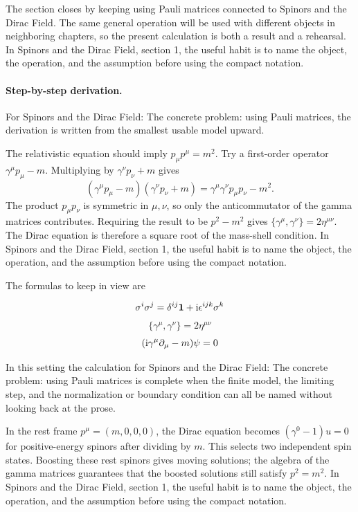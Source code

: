 The section closes by keeping using Pauli matrices connected to Spinors and the Dirac Field.  The same general operation will be used with different objects in neighboring chapters, so the present calculation is both a result and a rehearsal.  In Spinors and the Dirac Field, section 1, the useful habit is to name the object, the operation, and the assumption before using the compact notation.



\paragraph{Step-by-step derivation.}

For Spinors and the Dirac Field: The concrete problem: using Pauli matrices, the derivation is written from the smallest usable model upward.

The relativistic equation should imply \(p_\mu p^\mu=m^2\).  Try a first-order operator \(\gamma^\mu p_\mu-m\).  Multiplying by \(\gamma^\nu p_\nu+m\) gives
\[
  (\gamma^\mu p_\mu-m)(\gamma^\nu p_\nu+m)
  =
  \gamma^\mu\gamma^\nu p_\mu p_\nu-m^2.
\]
The product \(p_\mu p_\nu\) is symmetric in \(\mu,\nu\), so only the anticommutator of the gamma matrices contributes.  Requiring the result to be \(p^2-m^2\) gives \(\{\gamma^\mu,\gamma^\nu\}=2\eta^{\mu\nu}\).  The Dirac equation is therefore a square root of the mass-shell condition.  In Spinors and the Dirac Field, section 1, the useful habit is to name the object, the operation, and the assumption before using the compact notation.

The formulas to keep in view are

\[
  \sigma^i\sigma^j=\delta^{ij}\mathbf 1+\mathrm i\epsilon^{ijk}\sigma^k
\]
\[
  \{\gamma^\mu,\gamma^\nu\}=2\eta^{\mu\nu}
\]
\[
  (\mathrm i\gamma^\mu\partial_\mu-m)\psi=0
\]

In this setting the calculation for Spinors and the Dirac Field: The concrete problem: using Pauli matrices is complete when the finite model, the limiting step, and the normalization or boundary condition can all be named without looking back at the prose.




\begin{example}
In the rest frame \(p^\mu=(m,0,0,0)\), the Dirac equation becomes \((\gamma^0-1)u=0\) for positive-energy spinors after dividing by \(m\).  This selects two independent spin states.  Boosting these rest spinors gives moving solutions; the algebra of the gamma matrices guarantees that the boosted solutions still satisfy \(p^2=m^2\).  In Spinors and the Dirac Field, section 1, the useful habit is to name the object, the operation, and the assumption before using the compact notation.
\end{example}



